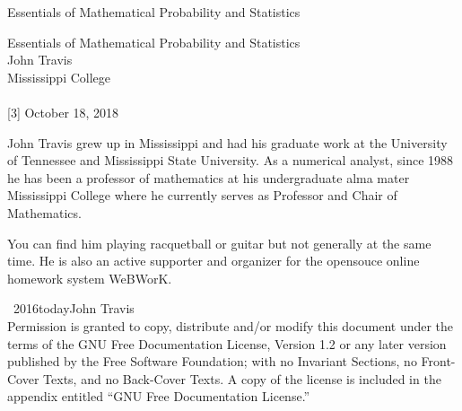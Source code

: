 \documentclass[10pt,]{book}
\numberwithin{equation}{section}
\begin{document}
\frontmatter
\thispagestyle{empty}
{\centering
\vspace*{0.28\textheight}
{\Huge Essentials of Mathematical Probability and Statistics}\\}
\clearpage
\thispagestyle{empty}
\null%
\clearpage
\thispagestyle{empty}
{\centering
\vspace*{0.14\textheight}
{\Huge Essentials of Mathematical Probability and Statistics}\\[3\baselineskip]
{\Large John Travis}\\[0.5\baselineskip]
{\Large Mississippi College}\\[3\baselineskip]
{\Large }\\[0.5\baselineskip]
[3\baselineskip]
{\Large October 18, 2018}\\}
\clearpage
\thispagestyle{empty}
\hypertarget{colophon-1}{}\noindent
\hypertarget{p-1}{}%
John Travis grew up in Mississippi and had his graduate work at the University of Tennessee and Mississippi State University. As a numerical analyst, since 1988 he has been a professor of mathematics at his undergraduate alma mater Mississippi College where he currently serves as Professor and Chair of Mathematics.%
\par
\hypertarget{p-2}{}%
You can find him playing racquetball or guitar but not generally at the same time. He is also an active supporter and organizer for the opensouce online homework system WeBWorK.%
\par
{}
\noindent\textcopyright\ 2016\textendash{}today\quad{}John Travis\\[0.5\baselineskip]
Permission is granted to copy, distribute and/or modify this document under the terms of the GNU Free Documentation License, Version 1.2 or any later version published by the Free Software Foundation; with no Invariant Sections, no Front-Cover Texts, and no Back-Cover Texts.  A copy of the license is included in the appendix entitled ``GNU Free Documentation License.''\par\medskip
{}
\null\clearpage
\end{document}
